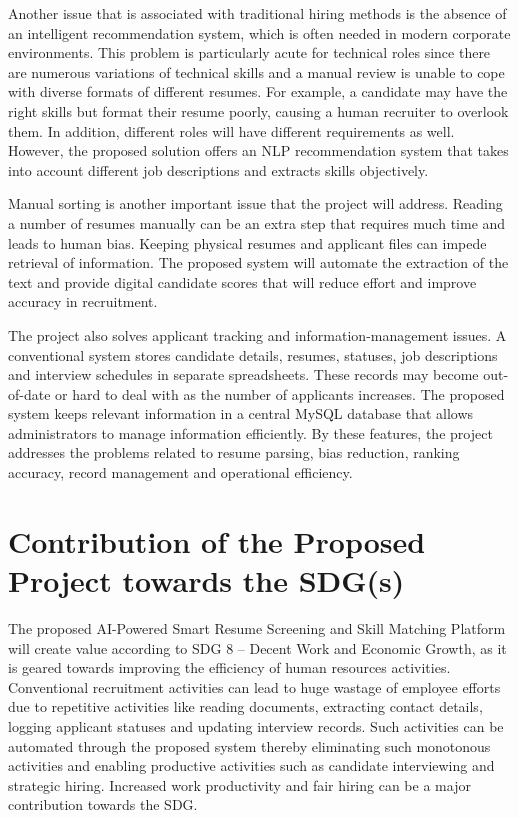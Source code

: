 \documentclass[12pt,a4paper]{report}
\begin{document}
Another issue that is associated with traditional hiring methods is the absence of an intelligent recommendation system, which is often needed in modern corporate environments. This problem is particularly acute for technical roles since there are numerous variations of technical skills and a manual review is unable to cope with diverse formats of different resumes. For example, a candidate may have the right skills but format their resume poorly, causing a human recruiter to overlook them. In addition, different roles will have different requirements as well. However, the proposed solution offers an NLP recommendation system that takes into account different job descriptions and extracts skills objectively.

Manual sorting is another important issue that the project will address. Reading a number of resumes manually can be an extra step that requires much time and leads to human bias. Keeping physical resumes and applicant files can impede retrieval of information. The proposed system will automate the extraction of the text and provide digital candidate scores that will reduce effort and improve accuracy in recruitment.

The project also solves applicant tracking and information-management issues. A conventional system stores candidate details, resumes, statuses, job descriptions and interview schedules in separate spreadsheets. These records may become out-of-date or hard to deal with as the number of applicants increases. The proposed system keeps relevant information in a central MySQL database that allows administrators to manage information efficiently. By these features, the project addresses the problems related to resume parsing, bias reduction, ranking accuracy, record management and operational efficiency.


\section{Contribution of the Proposed Project towards the SDG(s)}
The proposed AI-Powered Smart Resume Screening and Skill Matching Platform will create value according to SDG 8 – Decent Work and Economic Growth, as it is geared towards improving the efficiency of human resources activities. Conventional recruitment activities can lead to huge wastage of employee efforts due to repetitive activities like reading documents, extracting contact details, logging applicant statuses and updating interview records. Such activities can be automated through the proposed system thereby eliminating such monotonous activities and enabling productive activities such as candidate interviewing and strategic hiring. Increased work productivity and fair hiring can be a major contribution towards the SDG.
\end{document}
